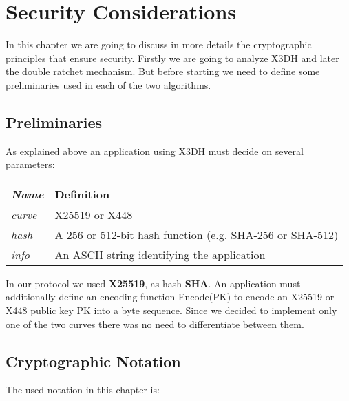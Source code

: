 \chapter{Security Considerations}
\label{cha:Security}

In this chapter we are going to discuss in more details the cryptographic principles that ensure security. Firstly we are going to analyze X3DH and later the double ratchet mechanism. But before starting we need to define some preliminaries used in each of the two algorithms.

\section{Preliminaries}
\label{sec:Preliminaries}

As explained above an application using X3DH must decide on several parameters:

\vspace{0.5cm}
\begin{center}
\begin{tabular}{>{\itshape}l p{10cm}}
\toprule
Name & Definition \\
\midrule
curve & X25519 or X448 \\
hash & A 256 or 512-bit hash function (e.g. SHA-256 or SHA-512) \\
info & An ASCII string identifying the application \\
\bottomrule
\end{tabular}
\end{center}

\vspace{0.5cm}

In our protocol we used \textbf{X25519}, as hash \textbf{SHA}. An application must additionally define an encoding function Encode(PK) to encode an X25519 or X448 public key PK into a byte sequence. Since we decided to implement only one of the two curves there was no need to differentiate between them.

\section{Cryptographic Notation}
\label{sec:Crytpographic Notation}

The used notation in this chapter is:


